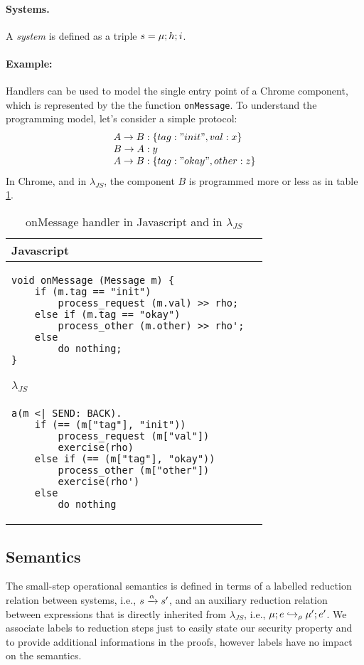 \paragraph*{Systems.} 
A \emph{system} is defined as a triple $s = \mu;h;i$.


\paragraph{Example:}
Handlers can be used to model the single entry point of a Chrome component, which is represented by the the function \texttt{onMessage}. To understand the programming model, let's consider a simple protocol:
\[
\begin{array}{l}
A \rightarrow B: \{tag: "init", val: x\} \\
B \rightarrow A: y \\
A \rightarrow B: \{tag: "okay", other: z\}
\end{array}
\]
In Chrome, and in $\lambda_{JS}$, the component $B$ is programmed more or less as in table \ref{tab:OnMessageCalc}. 

\begin{table}[tlb]
\begin{small}
\begin{center}
\begin{tabular}{p{0.95\linewidth}}
Javascript\\
\hline
\lstset{language=java}
\begin{lstlisting}
void onMessage (Message m) {
    if (m.tag == "init")
        process_request (m.val) >> rho;
    else if (m.tag == "okay")
        process_other (m.other) >> rho';
    else
        do nothing;
}
\end{lstlisting}\\
\hline
\hline
$\lambda_{JS}$\\
\hline
\lstset{language=ml}
\begin{lstlisting}
a(m <| SEND: BACK).
	if (== (m["tag"], "init"))
		process_request (m["val"])
		exercise(rho)
	else if (== (m["tag"], "okay"))
		process_other (m["other"])
		exercise(rho')
	else
		do_nothing
\end{lstlisting}
\end{tabular}
\end{center}
\end{small}
\caption{onMessage handler in Javascript and in $\lambda_{JS}$}
\label{tab:OnMessageCalc}
\end{table}


\subsection{Semantics}
The small-step operational semantics is defined in terms of a labelled
reduction relation between systems, i.e., $s \xrightarrow{\alpha} s'$, and an
auxiliary reduction relation between expressions that is directly inherited
from $\lambda_{JS}$, i.e.,  $\mu;e \hookrightarrow_\rho \mu';e'$. We associate
labels to reduction steps just to easily state our security property and 
to provide additional informations in the proofs, however labels have no 
impact on the semantics.

